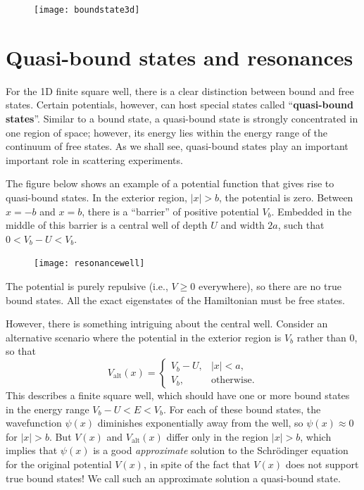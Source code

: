 \documentclass[pra,12pt]{revtex4}
\begin{document}
\vskip 0.15in
\begin{figure}[h]
  \centering\texttt{[image: boundstate3d]}
\end{figure}

\section{Quasi-bound states and resonances}
\label{sec:resonances}

For the 1D finite square well, there is a clear distinction between
bound and free states.  Certain potentials, however, can host special
states called ``\textbf{quasi-bound states}''.  Similar to a bound
state, a quasi-bound state is strongly concentrated in one region of
space; however, its energy lies within the energy range of the
continuum of free states.  As we shall see, quasi-bound states play an
important important role in scattering experiments.

The figure below shows an example of a potential function that gives
rise to quasi-bound states.  In the exterior region, $|x| > b$, the
potential is zero.  Between $x = -b$ and $x = b$, there is a
``barrier'' of positive potential $V_b$.  Embedded in the middle of
this barrier is a central well of depth $U$ and width $2a$, such that
$0 < V_b - U < V_b$.

\begin{figure}[h]
  \centering\texttt{[image: resonancewell]}
\end{figure}

\noindent
The potential is purely repulsive (i.e., $V \ge 0$ everywhere), so
there are no true bound states.  All the exact eigenstates of the
Hamiltonian must be free states.

However, there is something intriguing about the central well.
Consider an alternative scenario where the potential in the exterior
region is $V_b$ rather than $0$, so that
\begin{equation}
  V_{\mathrm{alt}}(x) = \begin{cases}V_b - U, & |x| < a, \\ V_b, & \mathrm{otherwise}.\end{cases}
\end{equation}
This describes a finite square well, which should have one or more
bound states in the energy range $V_b-U < E < V_b$.  For each of these
bound states, the wavefunction $\psi(x)$ diminishes exponentially away
from the well, so $\psi(x) \approx 0$ for $|x| > b$.  But $V(x)$ and
$V_{\mathrm{alt}}(x)$ differ only in the region $|x| > b$, which
implies that $\psi(x)$ is a good \textit{approximate} solution to the
Schr\"odinger equation for the original potential $V(x)$, in spite of
the fact that $V(x)$ does not support true bound states!  We call such
an approximate solution a quasi-bound state.
\end{document}
